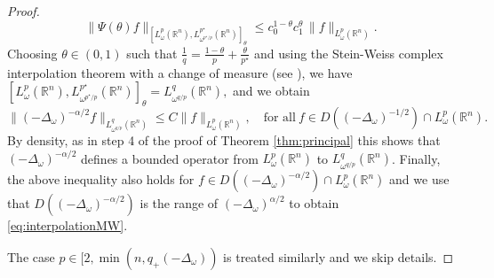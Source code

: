 \documentclass[12pt, letterpaper]{amsart}
\theoremstyle{definition}
\theoremstyle{remark}
\numberwithin{equation}{section}
\begin{document}
{\begin{proof}
{    \begin{equation*}
        \| \Psi(\theta)f \|_{[ L^p_\omega(\mathbb{R}^n),L^{p^\star}_{\omega^{p^\star/p}}(\mathbb{R}^n) ]_\theta } \le c_0^{1-\theta} c_1^\theta \, \| f \|_{L^p_\omega(\mathbb{R}^n)}.
    \end{equation*}
    Choosing $\theta \in (0,1)$ such that $\frac{1}{q}=\frac{1-\theta}{p}+\frac{\theta}{p^\star}$ and using the Stein-Weiss complex interpolation theorem with a change of measure (see \cite[Theorem 5.5.3]{bergh2012interpolation}), we have 
     $[ L^p_\omega(\mathbb{R}^n),L^{p^\star}_{\omega^{p^\star/p}}(\mathbb{R}^n) ]_\theta = L^{q}_{{\omega}^{q/p}}(\mathbb{R}^n),$
    and we obtain
     \begin{equation}\label{eq:MW}
        \| (-\Delta_\omega )^{-\alpha/2 } f \|_{L^{q}_{{\omega}^{q/p}}(\mathbb{R}^n)} \leq C \|  f \|_{L^p_\omega(\mathbb{R}^n)}, \quad \text{for all} \ f \in D((-\Delta_\omega)^{-1/2 })\cap L^p_\omega(\mathbb{R}^n).
    \end{equation}
    By density, as in step 4 of the proof of Theorem \ref{thm:principal} this shows that $(-\Delta_\omega)^{-\alpha/2}$ defines a bounded operator from $L^p_\omega(\mathbb{R}^n)$ to $L^q_{\omega^{q/p}}(\mathbb{R}^n)$. Finally, the above inequality also holds for $f \in D((-\Delta_\omega)^{-\alpha/2 })\cap L^p_\omega(\mathbb{R}^n)$ and we use that $D((-\Delta_\omega)^{-\alpha/2 })$ is the range of $(-\Delta_\omega)^{\alpha/2 }$ to obtain \eqref{eq:interpolationMW}. 
    
    {The case $p\in [2,\min(n,q_+(-\Delta_\omega))$ is treated similarly and we skip details.}}
\end{proof}





}
\end{document}
